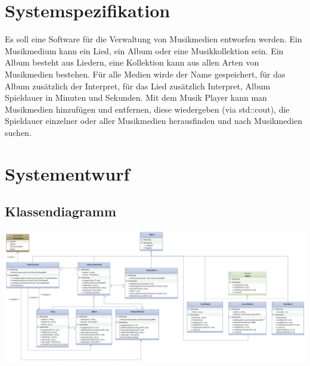 \documentclass[12pt,a4paper]{article}
\begin{document}
\section{Systemspezifikation}
Es soll eine Software für die Verwaltung von Musikmedien entworfen werden. Ein Musikmedium kann ein Lied, ein Album oder eine Musikkollektion sein. Ein Album besteht aus Liedern, eine Kollektion kann aus allen Arten von Musikmedien bestehen. Für alle Medien wirde der Name gespeichert, für das Album zusätzlich der Interpret, für das Lied zusätzlich Interpret, Album Spieldauer in Minuten und Sekunden. Mit dem Musik Player kann man Musikmedien hinzufügen und entfernen, diese wiedergeben (via std::cout), die Spieldauer einzelner oder aller Musikmedien herausfinden und nach Musikmedien suchen.
\\


\newpage
\section {Systementwurf}

\subsection {Klassendiagramm}

\includegraphics[angle=90,scale=0.5] {../Klassendiagramm.png}

\newpage
\end{document}
